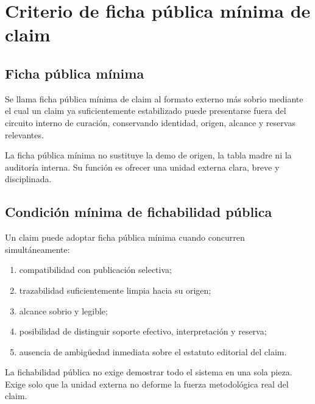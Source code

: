 \chapter{Criterio de ficha pública mínima de claim}

\section{Ficha pública mínima}
\begin{definition}
Se llama ficha pública mínima de claim al formato externo más sobrio mediante el cual un claim ya suficientemente estabilizado puede presentarse fuera del circuito interno de curación, conservando identidad, origen, alcance y reservas relevantes.
\end{definition}

\begin{observation}
La ficha pública mínima no sustituye la demo de origen, la tabla madre ni la auditoría interna. Su función es ofrecer una unidad externa clara, breve y disciplinada.
\end{observation}

\section{Condición mínima de fichabilidad pública}
\begin{definition}
Un claim puede adoptar ficha pública mínima cuando concurren simultáneamente:
\begin{enumerate}
  \item compatibilidad con publicación selectiva;
  \item trazabilidad suficientemente limpia hacia su origen;
  \item alcance sobrio y legible;
  \item posibilidad de distinguir soporte efectivo, interpretación y reserva;
  \item ausencia de ambigüedad inmediata sobre el estatuto editorial del claim.
\end{enumerate}
\end{definition}

\begin{observation}
La fichabilidad pública no exige demostrar todo el sistema en una sola pieza. Exige solo que la unidad externa no deforme la fuerza metodológica real del claim.
\end{observation}

